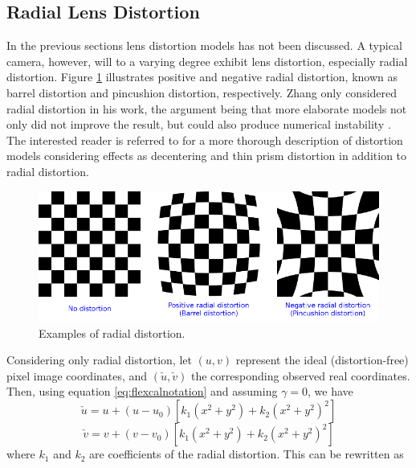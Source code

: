 \subsection{Radial Lens Distortion}
In the previous sections lens distortion models has not been discussed. A typical camera, however, will to a varying degree exhibit lens distortion, especially radial distortion. Figure \ref{fig:distortion_illustration} illustrates positive and negative radial distortion, known as barrel distortion and pincushion distortion, respectively. Zhang only considered radial distortion in his work, the argument being that more elaborate models not only did not improve the result, but could also produce numerical instability \cite{zhangTech}.
The interested reader is referred to \cite{wengCalibration, weiCalibration, Brown71close-rangecamera} for a more thorough description of distortion models considering effects as decentering and thin prism distortion in addition to radial distortion.
\begin{figure}[H]
    \centering
    \includegraphics[width=\linewidth]{fig/distortion_examples.png}
    \caption{Examples of radial distortion. \protect\footnotemark}
    \label{fig:distortion_illustration}
\end{figure}
Considering only radial distortion, let $(u,v)$ represent the ideal (distortion-free) pixel image coordinates, and $(\check{u},\check{v})$ the corresponding observed real coordinates. Then, using equation \ref{eq:flexcalnotation} and assuming $\gamma = 0$, we have \cite{zhangTech}
\begin{equation}
\label{eq:dist_u}
    \check{u}=u+(u-u_0)[k_1(x^2+y^2)+k_2(x^2+y^2)^2]
\end{equation}
\begin{equation}
\label{eq:dist_v}
    \check{v}=v+(v-v_0)[k_1(x^2+y^2)+k_2(x^2+y^2)^2]
\end{equation}
where $k_1$ and $k_2$ are coefficients of the radial distortion. This can be rewritten as 
